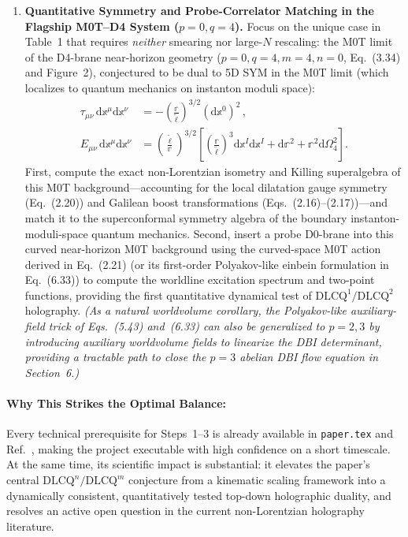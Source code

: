 \documentclass[11pt,a4paper]{article}
\newcommand{\dd}{\mathrm{d}}
\begin{document}
\begin{enumerate}[label=\textbf{Step \arabic*:},leftmargin=4.2em]
    \item \textbf{Quantitative Symmetry and Probe-Correlator Matching in the Flagship M0T--D4 System ($p=0, q=4$).}
    Focus on the unique case in Table~1 that requires \emph{neither} smearing nor large-$N$ rescaling: the M0T limit of the D4-brane near-horizon geometry ($p=0, q=4, m=4, n=0$, Eq.~(3.34) and Figure~2), conjectured to be dual to 5D SYM in the M0T limit (which localizes to quantum mechanics on instanton moduli space):
    \begin{subequations}
    \begin{align}
        \tau_{\mu\nu}\,\dd\mathbb{x}^\mu\dd\mathbb{x}^\nu &= -\left(\frac{\mathbb{r}}{\tilde{\ell}}\right)^{\!\!3/2} (\dd\mathbb{x}^0)^2\,, \\
        E_{\mu\nu}\,\dd\mathbb{x}^\mu\dd\mathbb{x}^\nu &= \left(\frac{\tilde{\ell}}{\mathbb{r}}\right)^{\!\!3/2}\left[\left(\frac{\mathbb{r}}{\tilde{\ell}}\right)^{\!\!3}\dd\mathbb{x}^I\dd\mathbb{x}^I + \dd\mathbb{r}^2 + \mathbb{r}^2\dd\Omega_4^2\right].
    \end{align}
    \end{subequations}
    First, compute the exact non-Lorentzian isometry and Killing superalgebra of this M0T background---accounting for the local dilatation gauge symmetry (Eq.~(2.20)) and Galilean boost transformations (Eqs.~(2.16)--(2.17))---and match it to the superconformal symmetry algebra of the boundary instanton-moduli-space quantum mechanics. Second, insert a probe D0-brane into this curved near-horizon M0T background using the curved-space M0T action derived in Eq.~(2.21) (or its first-order Polyakov-like einbein formulation in Eq.~(6.33)) to compute the worldline excitation spectrum and two-point functions, providing the first quantitative dynamical test of $\text{DLCQ}^1/\text{DLCQ}^2$ holography.
    \emph{(As a natural worldvolume corollary, the Polyakov-like auxiliary-field trick of Eqs.~(5.43) and~(6.33) can also be generalized to $p=2,3$ by introducing auxiliary worldvolume fields to linearize the DBI determinant, providing a tractable path to close the $p=3$ abelian DBI flow equation in Section~6.)}
\end{enumerate}

\paragraph{Why This Strikes the Optimal Balance:}
Every technical prerequisite for Steps~1--3 is already available in \texttt{paper.tex} and Ref.~\cite{Bergshoeff:2024nin}, making the project executable with high confidence on a short timescale. At the same time, its scientific impact is substantial: it elevates the paper's central $\text{DLCQ}^n/\text{DLCQ}^m$ conjecture from a kinematic scaling framework into a dynamically consistent, quantitatively tested top-down holographic duality, and resolves an active open question in the current non-Lorentzian holography literature.
\end{document}
